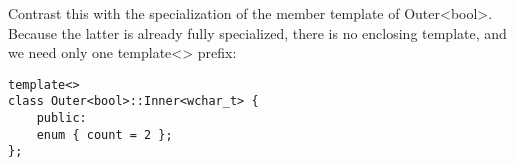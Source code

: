 Contrast this with the specialization of the member template of Outer<bool>. Because the latter is already fully specialized, there is no enclosing template, and we need only one template<> prefix:

\begin{lstlisting}[style=styleCXX]
template<>
class Outer<bool>::Inner<wchar_t> {
	public:
	enum { count = 2 };
};
\end{lstlisting}
































